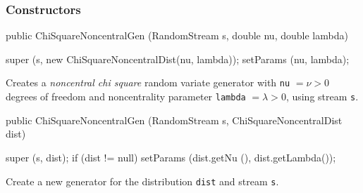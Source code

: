 \subsubsection* {Constructors}
\begin{code}

   public ChiSquareNoncentralGen (RandomStream s, double nu, double lambda) \begin{hide} {
      super (s, new ChiSquareNoncentralDist(nu, lambda));
      setParams (nu, lambda);
   }\end{hide}
\end{code}
\begin{tabb}  Creates a \emph{noncentral chi square}  random variate generator
 with \texttt{nu} $=\nu>0$ degrees of freedom and noncentrality parameter
\texttt{lambda} $= \lambda>0$,
 using stream \texttt{s}.
\end{tabb}
\begin{code}

   public ChiSquareNoncentralGen (RandomStream s,
                                  ChiSquareNoncentralDist dist) \begin{hide} {
      super (s, dist);
      if (dist != null)
         setParams (dist.getNu (), dist.getLambda());
   }\end{hide}
\end{code}
\begin{tabb}  Create a new generator for the distribution \texttt{dist}
    and stream \texttt{s}.
\end{tabb}

